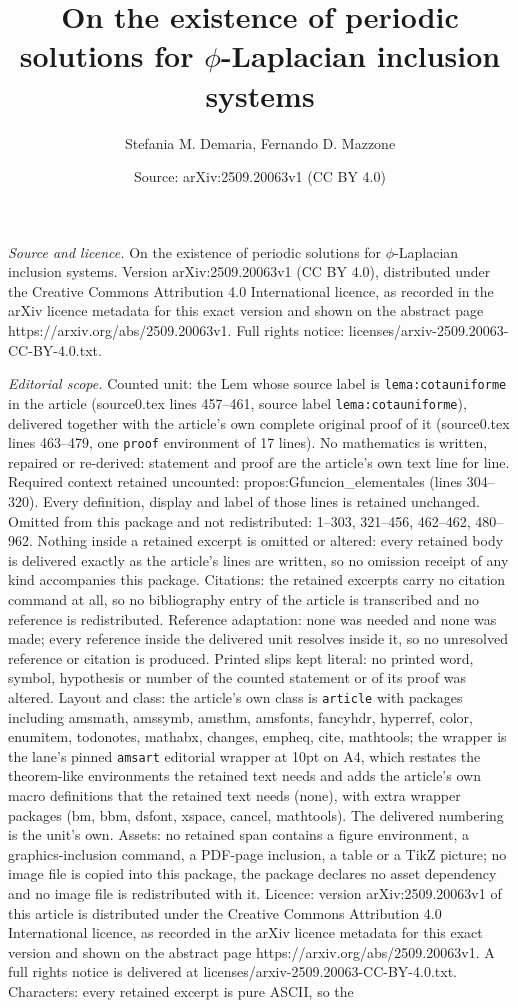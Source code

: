 \documentclass[10pt,a4paper]{amsart}
\title[On the existence of periodic solutions for $\phi$-Laplacian ]{On the existence of periodic solutions for $\phi$-Laplacian inclusion systems}
\author{Stefania M. Demaria, Fernando D. Mazzone}
\date{Source: arXiv:2509.20063v1 (CC BY 4.0)}
\begin{document}
\maketitle

\noindent\emph{Source and licence.} On the existence of periodic solutions for $\phi$-Laplacian inclusion systems. Version arXiv:2509.20063v1 (CC BY 4.0), distributed under the Creative Commons Attribution 4.0 International licence, as recorded in the arXiv licence metadata for this exact version and shown on the abstract page https://arxiv.org/abs/2509.20063v1. Full rights notice: licenses/arxiv-2509.20063-CC-BY-4.0.txt.\par\smallskip

\noindent\textit{Editorial scope.} Counted unit: the Lem whose source label is \texttt{lema:cotauniforme} in the article (source0.tex lines 457--461, source label \texttt{lema:cotauniforme}), delivered together with the article's own complete original proof of it (source0.tex lines 463--479, one \texttt{proof} environment of 17 lines). No mathematics is written, repaired or re-derived: statement and proof are the article's own text line for line. Required context retained uncounted: propos:Gfuncion\_elementales (lines 304--320). Every definition, display and label of those lines is retained unchanged. Omitted from this package and not redistributed: 1--303, 321--456, 462--462, 480--962. Nothing inside a retained excerpt is omitted or altered: every retained body is delivered exactly as the article's lines are written, so no omission receipt of any kind accompanies this package. Citations: the retained excerpts carry no citation command at all, so no bibliography entry of the article is transcribed and no reference is redistributed. Reference adaptation: none was needed and none was made; every reference inside the delivered unit resolves inside it, so no unresolved reference or citation is produced. Printed slips kept literal: no printed word, symbol, hypothesis or number of the counted statement or of its proof was altered. Layout and class: the article's own class is \texttt{article} with packages including amsmath, amssymb, amsthm, amsfonts, fancyhdr, hyperref, color, enumitem, todonotes, mathabx, changes, empheq, cite, mathtools; the wrapper is the lane's pinned \texttt{amsart} editorial wrapper at 10pt on A4, which restates the theorem-like environments the retained text needs and adds the article's own macro definitions that the retained text needs (none), with extra wrapper packages (bm, bbm, dsfont, xspace, cancel, mathtools). The delivered numbering is the unit's own. Assets: no retained span contains a figure environment, a graphics-inclusion command, a PDF-page inclusion, a table or a TikZ picture; no image file is copied into this package, the package declares no asset dependency and no image file is redistributed with it. Licence: version arXiv:2509.20063v1 of this article is distributed under the Creative Commons Attribution 4.0 International licence, as recorded in the arXiv licence metadata for this exact version and shown on the abstract page https://arxiv.org/abs/2509.20063v1. A full rights notice is delivered at licenses/arxiv-2509.20063-CC-BY-4.0.txt. Characters: every retained excerpt is pure ASCII, so the 
\end{document}
